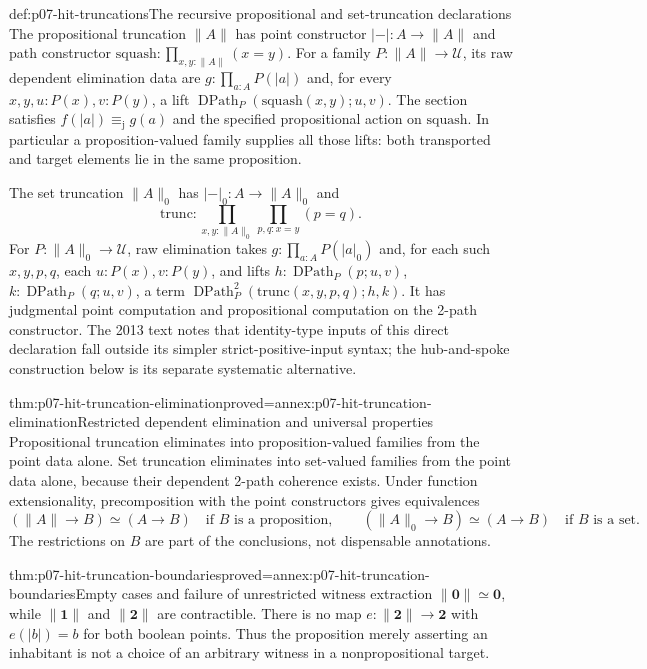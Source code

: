 \begin{hbdefinition}{def:p07-hit-truncations}{The recursive propositional and set-truncation declarations}
The propositional truncation \(\|A\|\) has point constructor
\(|-|:A\to\|A\|\) and path constructor
\(\mathrm{squash}:\prod_{x,y:\|A\|}(x=y)\). For a family
\(P:\|A\|\to\mathcal U\), its raw dependent elimination data are
\(g:\prod_{a:A}P(|a|)\) and, for every \(x,y,u:P(x),v:P(y)\),
a lift \(\operatorname{DPath}_P(\mathrm{squash}(x,y);u,v)\).
The section satisfies \(f(|a|)\equiv_{\mathrm j}g(a)\) and the
specified propositional action on \(\mathrm{squash}\).
In particular a proposition-valued family supplies all those lifts: both
transported and target elements lie in the same proposition.

The set truncation \(\|A\|_0\) has \(|-|_0:A\to\|A\|_0\) and
\[
 \mathrm{trunc}:\prod_{x,y:\|A\|_0}\prod_{p,q:x=y}(p=q).
\]
For \(P:\|A\|_0\to\mathcal U\), raw elimination takes
\(g:\prod_{a:A}P(|a|_0)\) and, for each such \(x,y,p,q\), each
\(u:P(x),v:P(y)\), and lifts \(h:\operatorname{DPath}_P(p;u,v)\),
\(k:\operatorname{DPath}_P(q;u,v)\), a term
\(\operatorname{DPath}^2_P(\mathrm{trunc}(x,y,p,q);h,k)\).
It has judgmental point computation and propositional computation on the
2-path constructor. The 2013 text notes that identity-type inputs of this
direct declaration fall outside its simpler strict-positive-input syntax;
the hub-and-spoke construction below is its separate systematic alternative.
\end{hbdefinition}

\begin{hbtheorem}{thm:p07-hit-truncation-elimination}{proved=annex:p07-hit-truncation-elimination}{Restricted dependent elimination and universal properties}
Propositional truncation eliminates into proposition-valued families from
the point data alone. Set truncation eliminates into set-valued families
from the point data alone, because their dependent 2-path coherence exists.
Under function extensionality, precomposition with the point constructors
gives equivalences
\[
 (\|A\|\to B)\simeq(A\to B)\quad\text{if }B\text{ is a proposition},
 \qquad
 (\|A\|_0\to B)\simeq(A\to B)\quad\text{if }B\text{ is a set}.
\]
The restrictions on \(B\) are part of the conclusions, not dispensable
annotations.
\end{hbtheorem}

\begin{hbtheorem}{thm:p07-hit-truncation-boundaries}{proved=annex:p07-hit-truncation-boundaries}{Empty cases and failure of unrestricted witness extraction}
\(\|\mathbf0\|\simeq\mathbf0\), while \(\|\mathbf1\|\) and
\(\|\mathbf2\|\) are contractible. There is no map
\(e:\|\mathbf2\|\to\mathbf2\) with \(e(|b|)=b\) for both boolean
points. Thus the proposition merely asserting an inhabitant is not a
choice of an arbitrary witness in a nonpropositional target.
\end{hbtheorem}


